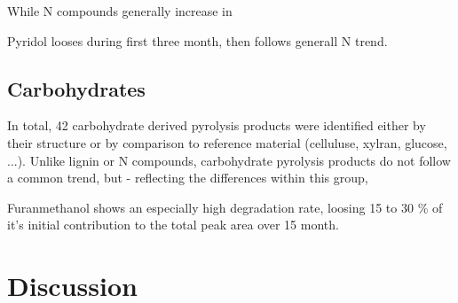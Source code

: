 \documentclass[preprint,12pt]{elsarticle}
\begin{document}
While N compounds generally increase in 

Pyridol looses during first three month, then follows generall N trend.

\subsection{Carbohydrates}
In total, 42 carbohydrate derived pyrolysis products were identified either by their structure or by comparison to reference material (celluluse, xylran, glucose, ...). Unlike lignin or N compounds, carbohydrate pyrolysis products do not follow a common trend, but - reflecting the differences within this group, 


Furanmethanol shows an especially high degradation rate, loosing 15 to 30 \% of it's initial contribution to the total peak area over 15 month.


\section{Discussion}
\end{document}
